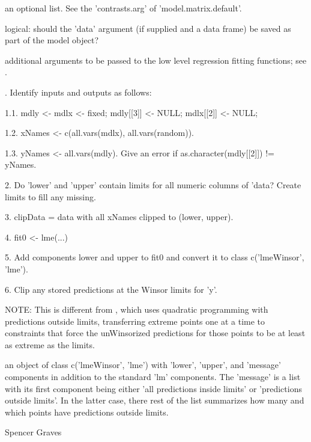 \documentclass{article}
\begin{document}
\begin{Arguments}
\begin{ldescription}
\item[\code{ contrasts }] an optional list. See the 'contrasts.arg' of
'model.matrix.default'. 

\item[\code{keep.data}] logical: should the 'data' argument (if supplied and a data frame)
be saved as part of the model object? 

\item[\code{...}] additional arguments to be passed to the low level regression
fitting functions;  see . 

\end{ldescription}
\end{Arguments}
\begin{Details}.  Identify inputs and outputs as follows:

1.1.  mdly <- mdlx <- fixed;  mdly[[3]] <- NULL;  mdlx[[2]] <- NULL;

1.2.  xNames <- c(all.vars(mdlx), all.vars(random)).

1.3.  yNames <- all.vars(mdly).  Give an error if
as.character(mdly[[2]]) != yNames. 

2.  Do 'lower' and 'upper' contain limits for all numeric columns of
'data?  Create limits to fill any missing.   

3.  clipData = data with all xNames clipped to (lower, upper).

4.  fit0 <- lme(...)

5.  Add components lower and upper to fit0 and convert it to class
c('lmeWinsor', 'lme').  

6.  Clip any stored predictions at the Winsor limits for 'y'.  

NOTE:  This is different from , which uses quadratic 
programming with predictions outside limits, transferring extreme
points one at a time to constraints that force the unWinsorized
predictions for those points to be at least as extreme as the limits.
\end{Details}
\begin{Value}
an object of class c('lmeWinsor', 'lme') with 'lower', 'upper', and
'message' components in addition to the standard 'lm' components.  The
'message' is a list with its first component being either 'all
predictions inside limits' or 'predictions outside limits'.  In the
latter case, there rest of the list summarizes how many and which
points have predictions outside limits.
\end{Value}
\begin{Author}\relax
Spencer Graves
\end{Author}
\end{document}
